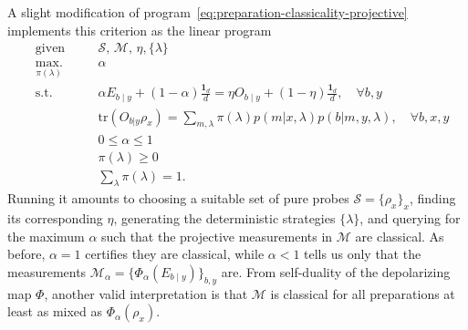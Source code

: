         A slight modification of program~\eqref{eq:preparation-classicality-projective} implements this criterion as the linear program
        \begin{subequations}
            \begin{alignat}{2}
                &\text{given}    &\quad & \mathcal{S},\, \mathcal{M},\, \eta, \{ \lambda \} \\
                &\underset{\pi(\lambda)}{\text{max.}}   &	  & \alpha \\
                &\text{s.t.}    &      & \alpha E_{b \mid y} + (1 - \alpha)\frac{\mathbf{1}_d}{d} = \eta O_{b \mid y} + \left( 1 - \eta \right) \frac{\mathbf{1}_d}{d}, \quad\forall b, y \\
                &                  &      & \text{tr}(O_{b \vert y} \rho_x) = \sum_{m, \lambda} \pi(\lambda) p(m \vert x, \lambda) p(b \vert m, y, \lambda), \quad\forall b, x, y \\
                &				   &	  & 0 \leq \alpha \leq 1 \\
                &				   &	  & \pi(\lambda) \geq 0 \\
                &				   &	  & \sum_\lambda \pi(\lambda) = 1 .
            \end{alignat}
            \label{eq:measurement-classicality-projective}
        \end{subequations}
        Running it amounts to choosing a suitable set of pure probes $\mathcal{S} = \{ \rho_x \}_x$, finding its corresponding $\eta$, generating the deterministic strategies $\{ \lambda \}$, and querying for the maximum $\alpha$ such that the projective measurements in $\mathcal{M}$ are classical. As before, $\alpha = 1$ certifies they are classical, while $\alpha < 1$ tells us only that the measurements $\mathcal{M}_\alpha = \{ \Phi_\alpha \left( E_{b \mid y} \right) \}_{b,y}$ are. From self-duality of the depolarizing map $\Phi$, another valid interpretation is that $\mathcal{M}$ is classical for all preparations at least as mixed as $\Phi_\alpha \left( \rho_x \right)$.


